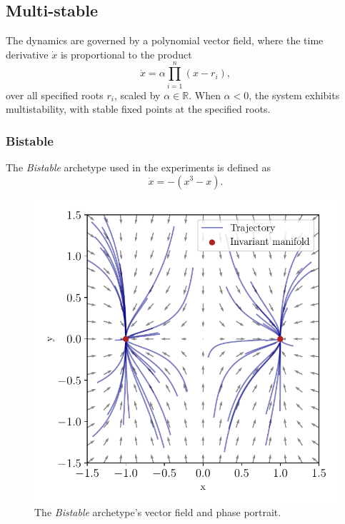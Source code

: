 \documentclass{article}
\theoremstyle{definition} \newtheorem{definition}{Definition}  \newtheorem{example}{Example}
\theoremstyle{remark} \newtheorem{remark}{Remark}
\newcounter{ct}
\newcommand{\field}[1]{\ensuremath{\mathbb{#1}}}
\newcommand{\reals}{\field{R}}
\begin{document}
\subsection{Multi-stable}\label{sec:multistable}
The dynamics are governed by a polynomial vector field, where the time derivative $\dot{x}$ is proportional to the product
\begin{equation}
\dot{x} = \alpha \prod_{i=1}^{n} (x - r_i),
\end{equation}
 over all specified roots $r_i$, scaled by $\alpha\in \reals$.
When $\alpha < 0$, the system exhibits multistability, with stable fixed points at the specified roots.

\subsubsection{Bistable}
The \emph{Bistable} archetype used in the experiments is defined as
\begin{equation}
\dot x = - (x^3 - x).
\end{equation}

\begin{figure}[htbp]
    \centering
    \includegraphics[width=.5\linewidth]{bistable_2d}
    \caption{The \emph{Bistable} archetype's vector field and phase portrait.
     }
    \label{fig:bistable_2d}
\end{figure}


%
%
\end{document}
